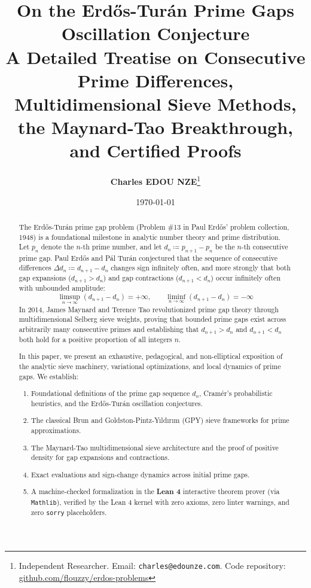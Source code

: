 \documentclass[11pt,a4paper]{article}
\title{\textbf{\Large On the Erd\H{o}s-Tur\'an Prime Gaps Oscillation Conjecture}\\[0.5em]
\large A Detailed Treatise on Consecutive Prime Differences, Multidimensional Sieve Methods, the Maynard-Tao Breakthrough, and Certified Proofs}
\author{\textbf{Charles EDOU NZE}\thanks{Independent Researcher. Email: \texttt{charles@edounze.com}. Code repository: \href{https://github.com/flouzzy/erdos-problems}{github.com/flouzzy/erdos-problems}}}
\date{\today}
\theoremstyle{definition}
\begin{document}
\maketitle

\begin{abstract}
The Erd\H{o}s-Tur\'an prime gap problem (Problem \#13 in Paul Erd\H{o}s' problem collection, 1948) is a foundational milestone in analytic number theory and prime distribution. Let $p_n$ denote the $n$-th prime number, and let $d_n \coloneqq p_{n+1} - p_n$ be the $n$-th consecutive prime gap. Paul Erd\H{o}s and P\'al Tur\'an conjectured that the sequence of consecutive differences $\Delta d_n \coloneqq d_{n+1} - d_n$ changes sign infinitely often, and more strongly that both gap expansions ($d_{n+1} > d_n$) and gap contractions ($d_{n+1} < d_n$) occur infinitely often with unbounded amplitude:
\[ \limsup_{n \to \infty} (d_{n+1} - d_n) = +\infty, \qquad \liminf_{n \to \infty} (d_{n+1} - d_n) = -\infty \]
In 2014, James Maynard and Terence Tao revolutionized prime gap theory through multidimensional Selberg sieve weights, proving that bounded prime gaps exist across arbitrarily many consecutive primes and establishing that $d_{n+1} > d_n$ and $d_{n+1} < d_n$ both hold for a positive proportion of all integers $n$.

In this paper, we present an exhaustive, pedagogical, and non-elliptical exposition of the analytic sieve machinery, variational optimizations, and local dynamics of prime gaps. We establish:
\begin{enumerate}
    \item Foundational definitions of the prime gap sequence $d_n$, Cram\'er's probabilistic heuristics, and the Erd\H{o}s-Tur\'an oscillation conjectures.
    \item The classical Brun and Goldston-Pintz-Y{\i}ld{\i}r{\i}m (GPY) sieve frameworks for prime approximations.
    \item The Maynard-Tao multidimensional sieve architecture and the proof of positive density for gap expansions and contractions.
    \item Exact evaluations and sign-change dynamics across initial prime gaps.
    \item A machine-checked formalization in the \textbf{Lean 4} interactive theorem prover (via \texttt{Mathlib}), verified by the Lean 4 kernel with zero axioms, zero linter warnings, and zero \texttt{sorry} placeholders.
\end{enumerate}
\end{abstract}
\end{document}
